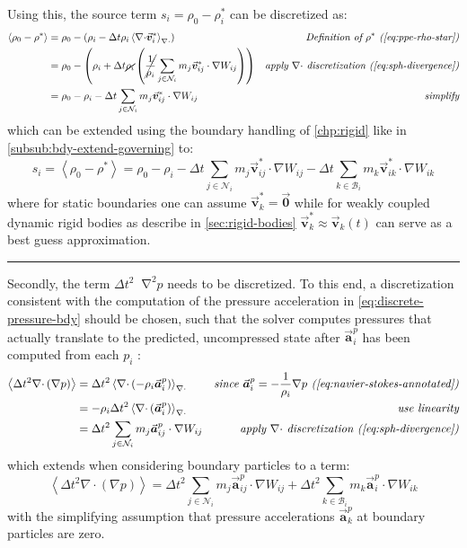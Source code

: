 \documentclass[oneside, a4paper]{book}
\newcommand\horizontalspacer[0]{\vspace{5pt}\noindent\textcolor{lightgray}{\rule{\textwidth}{1mm}}
\vspace{5pt}}
\newcommand\angled[1]{\left\langle#1\right\rangle}
\newcommand*\Laplace{\mathop{}\!\mathbin\nabla^2}
\newcommand\vek[1]{\vec{\bm{#1}}}
\newcommand\br[1]{\left(#1\right)}
\newcommand\divergence{{\nabla\cdot}}
\begin{document}
    Using this, the source term $s_i=\rho_0-\rho^*_i$ can be discretized as:
    \begin{align}
      \angled{\rho_0-\rho^*} &= \rho_0 - \br{\rho_i - \Delta t \rho_i \angled{\divergence \vek{v}^*_i}_\divergence} &\textit{Definition of $\rho^*$ (\autoref{eq:ppe-rho-star})}\\
      &= \rho_0 - \br{\rho_i + \Delta t \cancel{\rho_i} \br{\cancel{\frac{1}{\rho_i}} \sum_{j\in\mathcal{N}_i} m_j\vek{v}^*_{ij}\cdot\nabla W_{ij}}} &\textit{apply $\divergence$ discretization (\autoref{eq:sph-divergence})}\\
      &= \rho_0 - \rho_i - \Delta t \sum_{j\in\mathcal{N}_i}  m_j\vek{v}^*_{ij}\cdot\nabla W_{ij} &\textit{simplify}
    \end{align}
    which can be extended using the boundary handling of \autoref{chp:rigid} like in \autoref{subsub:bdy-extend-governing} to:
    \begin{equation}
      s_i = \angled{\rho_0-\rho^*} =
      \rho_0 - \rho_i 
      - \Delta t \sum_{j\in\mathcal{N}_i}  m_j\vek{v}^*_{ij}\cdot\nabla W_{ij} 
      - \Delta t \sum_{k\in\mathcal{B}_i}  m_k\vek{v}^*_{ik}\cdot\nabla W_{ik}
      \label{eq:iisph-source-term}
    \end{equation}
    where for static boundaries one can assume $\vek{v}^*_k=\vek{0}$ while for weakly coupled dynamic rigid bodies as describe in \autoref{sec:rigid-bodies} $\vek{v}^*_k \approx \vek{v}_k\br{t}$ can serve as a best guess approximation. 
    
    \horizontalspacer

    Secondly, the term $\Delta t^2\Laplace p$ needs to be discretized. To this end, a discretization consistent with the computation of the pressure acceleration in \autoref{eq:discrete-pressure-bdy} should be chosen, such that the solver computes pressures that actually translate to the predicted, uncompressed state after $\vek{a}_i^p$ has been computed from each $p_i$ \autocite{tutorial2019}:
    \begin{align}
      \angled{\Delta t^2\divergence\br{\nabla p}} &= \Delta t^2\angled{\divergence\br{-\rho_i \vek{a}_i^p}}_\divergence &\textit{since $ \vek{a}_i^p=-\frac{1}{\rho_i}\nabla p$ (\autoref{eq:navier-stokes-annotated})}\\
      &= - \rho_i \Delta t^2\angled{\divergence\br{\vek{a}_i^p}}_\divergence&\textit{use linearity}\\
      &= 
      \Delta t^2 \sum_{j\in\mathcal{N}_i} m_j \vek{a}^p_{ij} \cdot \nabla W_{ij}
      &\textit{apply $\divergence$ discretization (\autoref{eq:sph-divergence})}
    \end{align}
    which extends when considering boundary particles to a term:
    \begin{equation}
      \angled{\Delta t^2\divergence\br{\nabla p}} =
      \Delta t^2 \sum_{j\in\mathcal{N}_i} m_j \vek{a}^p_{ij} \cdot \nabla W_{ij}
      +\Delta t^2 \sum_{k\in\mathcal{B}_i} m_k \vek{a}^p_{i} \cdot \nabla W_{ik}\label{eq:iisph-ap_i}
    \end{equation}
    with the simplifying assumption that pressure accelerations $\vek{a}^p_k$ at boundary particles are zero. 
    
\end{document}
